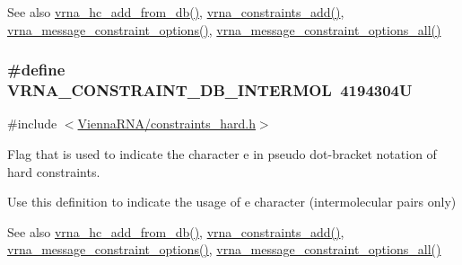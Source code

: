 \begin{DoxySeeAlso}{See also}
\hyperlink{group__hard__constraints_ga5b4de3247b67358080c176b94591a8e6}{vrna\+\_\+hc\+\_\+add\+\_\+from\+\_\+db()}, \hyperlink{group__constraints_ga35a401f680969a556858a8dd5f1d07cc}{vrna\+\_\+constraints\+\_\+add()}, \hyperlink{group__constraints_gaa1f20b53bf09ac2e6b0dbb13f7d89670}{vrna\+\_\+message\+\_\+constraint\+\_\+options()}, \hyperlink{group__constraints_gaec7e13fa0465c2acc7a621d1aecb709f}{vrna\+\_\+message\+\_\+constraint\+\_\+options\+\_\+all()} 
\end{DoxySeeAlso}
\hypertarget{group__hard__constraints_ga31d0ebb9755ca8a4acafc14f00ca755d}{}
\subsubsection[{V\+R\+N\+A\+\_\+\+C\+O\+N\+S\+T\+R\+A\+I\+N\+T\+\_\+\+D\+B\+\_\+\+I\+N\+T\+E\+R\+M\+O\+L}]{\setlength{\rightskip}{0pt plus 5cm}\#define V\+R\+N\+A\+\_\+\+C\+O\+N\+S\+T\+R\+A\+I\+N\+T\+\_\+\+D\+B\+\_\+\+I\+N\+T\+E\+R\+M\+O\+L~4194304\+U}\label{group__hard__constraints_ga31d0ebb9755ca8a4acafc14f00ca755d}


{\ttfamily \#include $<$\hyperlink{constraints__hard_8h}{Vienna\+R\+N\+A/constraints\+\_\+hard.\+h}$>$}



Flag that is used to indicate the character \textquotesingle{}e\textquotesingle{} in pseudo dot-\/bracket notation of hard constraints. 

Use this definition to indicate the usage of \textquotesingle{}e\textquotesingle{} character (intermolecular pairs only)

\begin{DoxySeeAlso}{See also}
\hyperlink{group__hard__constraints_ga5b4de3247b67358080c176b94591a8e6}{vrna\+\_\+hc\+\_\+add\+\_\+from\+\_\+db()}, \hyperlink{group__constraints_ga35a401f680969a556858a8dd5f1d07cc}{vrna\+\_\+constraints\+\_\+add()}, \hyperlink{group__constraints_gaa1f20b53bf09ac2e6b0dbb13f7d89670}{vrna\+\_\+message\+\_\+constraint\+\_\+options()}, \hyperlink{group__constraints_gaec7e13fa0465c2acc7a621d1aecb709f}{vrna\+\_\+message\+\_\+constraint\+\_\+options\+\_\+all()} 
\end{DoxySeeAlso}
\hypertarget{group__hard__constraints_ga75cfab03cdc97c95b3ce8bb29f52b08e}{}
